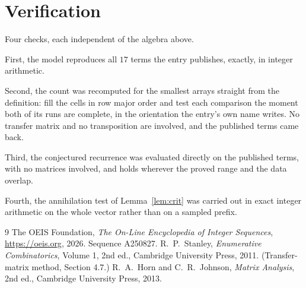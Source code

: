 \documentclass[11pt,a4paper]{article}
\theoremstyle{plain}
\theoremstyle{definition}
\begin{document}
\section{Verification}

Four checks, each independent of the algebra above.

First, the model reproduces all $17$ terms the entry publishes, exactly, in integer
arithmetic.

Second, the count was recomputed for the smallest arrays straight from the definition: fill the
cells in row major order and test each comparison the moment both of its runs are complete,
in the orientation the entry's own name writes. No transfer matrix and no transposition are
involved, and the published terms came back.

Third, the conjectured recurrence was evaluated directly on the published terms, with no
matrices involved, and holds wherever the proved range and the data overlap.

Fourth, the annihilation test of Lemma~\ref{lem:crit} was carried out in exact integer
arithmetic on the whole vector rather than on a sampled prefix.

\begin{thebibliography}{9}
 The OEIS Foundation, \emph{The On-Line Encyclopedia of Integer
Sequences}, \url{https://oeis.org}, 2026. Sequence A250827.
 R.~P.~Stanley, \emph{Enumerative Combinatorics}, Volume 1, 2nd ed.,
Cambridge University Press, 2011. (Transfer-matrix method, Section 4.7.)
 R.~A.~Horn and C.~R.~Johnson, \emph{Matrix Analysis}, 2nd ed., Cambridge
University Press, 2013.
\end{thebibliography}
\end{document}
